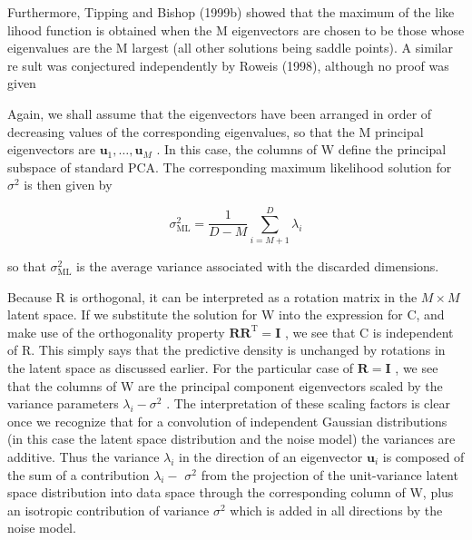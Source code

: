\documentclass[
  10
]{article}
\begin{document}
Furthermore, Tipping and Bishop (1999b) showed that the maximum of the
like lihood function is obtained when the M eigenvectors are chosen to
be those whose eigenvalues are the M largest (all other solutions being
saddle points). A similar re sult was conjectured independently by
Roweis (1998), although no proof was given

Again, we shall assume that the eigenvectors have been arranged in order
of decreasing values of the corresponding eigenvalues, so that the M
principal eigenvectors are
\(\mathbf { u } _ { 1 } , \dots , \mathbf { u } _ { M }\) . In this
case, the columns of W define the principal subspace of standard PCA.
The corresponding maximum likelihood solution for \(\sigma ^ { 2 }\) is
then given by

\[
\sigma_ {\mathrm{ML}} ^ {2} = \frac {1}{D - M} \sum_ {i = M + 1} ^ {D} \lambda_ {i}\tag{12.46}
\]

so that \(\sigma _ { \mathrm { M L } } ^ { 2 }\) is the average variance
associated with the discarded dimensions.

Because R is orthogonal, it can be interpreted as a rotation matrix in
the \(M \times M\) latent space. If we substitute the solution for W
into the expression for C, and make use of the orthogonality property
\(\mathbf { R R } ^ { \mathrm { T } } = \mathbf { I }\) , we see that C
is independent of R. This simply says that the predictive density is
unchanged by rotations in the latent space as discussed earlier. For the
particular case of \(\mathbf { R } = \mathbf { I }\) , we see that the
columns of W are the principal component eigenvectors scaled by the
variance parameters \(\lambda _ { i } - \sigma ^ { 2 }\) . The
interpretation of these scaling factors is clear once we recognize that
for a convolution of independent Gaussian distributions (in this case
the latent space distribution and the noise model) the variances are
additive. Thus the variance \(\lambda _ { i }\) in the direction of an
eigenvector \(\mathbf { u } _ { i }\) is composed of the sum of a
contribution \(\lambda _ { i } -\) \(\sigma ^ { 2 }\) from the
projection of the unit-variance latent space distribution into data
space through the corresponding column of W, plus an isotropic
contribution of variance \(\sigma ^ { 2 }\) which is added in all
directions by the noise model.
\end{document}
